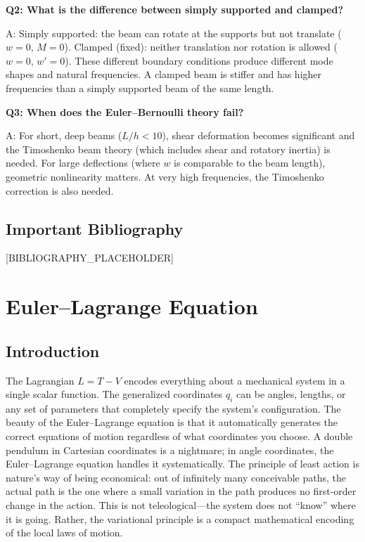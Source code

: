 \documentclass[11pt,openright]{book}
\begin{document}
\textbf{Q2: What is the difference between simply supported and clamped?}

A: Simply supported: the beam can rotate at the supports but not translate ($w = 0$, $M = 0$). Clamped (fixed): neither translation nor rotation is allowed ($w = 0$, $w' = 0$). These different boundary conditions produce different mode shapes and natural frequencies. A clamped beam is stiffer and has higher frequencies than a simply supported beam of the same length.

\textbf{Q3: When does the Euler--Bernoulli theory fail?}

A: For short, deep beams ($L/h < 10$), shear deformation becomes significant and the Timoshenko beam theory (which includes shear and rotatory inertia) is needed. For large deflections (where $w$ is comparable to the beam length), geometric nonlinearity matters. At very high frequencies, the Timoshenko correction is also needed.
\section*{Important Bibliography}

[BIBLIOGRAPHY_PLACEHOLDER]


\chapter{Euler--Lagrange Equation}

\section*{Introduction}

The Lagrangian $L = T - V$ encodes everything about a mechanical system in a single scalar function. The generalized coordinates $q_i$ can be angles, lengths, or any set of parameters that completely specify the system's configuration. The beauty of the Euler--Lagrange equation is that it automatically generates the correct equations of motion regardless of what coordinates you choose. A double pendulum in Cartesian coordinates is a nightmare; in angle coordinates, the Euler--Lagrange equation handles it systematically. The principle of least action is nature's way of being economical: out of infinitely many conceivable paths, the actual path is the one where a small variation in the path produces no first-order change in the action. This is not teleological---the system does not ``know'' where it is going. Rather, the variational principle is a compact mathematical encoding of the local laws of motion.
\end{document}
